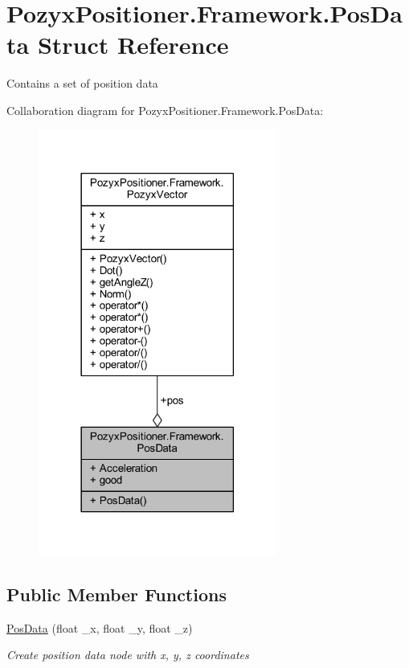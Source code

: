 \hypertarget{struct_pozyx_positioner_1_1_framework_1_1_pos_data}{}\section{Pozyx\+Positioner.\+Framework.\+Pos\+Data Struct Reference}
\label{struct_pozyx_positioner_1_1_framework_1_1_pos_data}


Contains a set of position data  




Collaboration diagram for Pozyx\+Positioner.\+Framework.\+Pos\+Data\+:
\nopagebreak
\begin{figure}[H]
\begin{center}
\leavevmode
\includegraphics[width=222pt]{struct_pozyx_positioner_1_1_framework_1_1_pos_data__coll__graph}
\end{center}
\end{figure}
\subsection*{Public Member Functions}
\begin{DoxyCompactItemize}
\item 
\hyperlink{struct_pozyx_positioner_1_1_framework_1_1_pos_data_a3a87fee055f3468cb530c7b2cb71098f}{Pos\+Data} (float \+\_\+x, float \+\_\+y, float \+\_\+z)
\begin{DoxyCompactList}\small\item\em Create position data node with x, y, z coordinates \end{DoxyCompactList}\end{DoxyCompactItemize}
